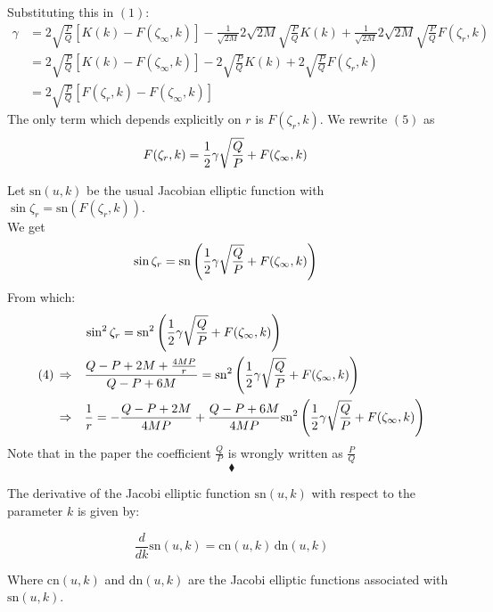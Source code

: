 Substituting this in $(1)$:
\begin{align}
\gamma&=2\sqrt{\frac{P}{Q}}\left[K{\left(k\right)}-F{\left(\zeta_{\infty},k\right)}\right]-\frac{1}{\sqrt{2M}}2\sqrt{2M}\sqrt{\frac{P}{Q}}K{\left(k\right)}+\frac{1}{\sqrt{2M}}2\sqrt{2M}\sqrt{\frac{P}{Q}}F{\left(\zeta_{r},k\right)}\nonumber \\
&=2\sqrt{\frac{P}{Q}}\left[K{\left(k\right)}-F{\left(\zeta_{\infty},k\right)}\right]-2\sqrt{\frac{P}{Q}}K{\left(k\right)}+2\sqrt{\frac{P}{Q}}F{\left(\zeta_{r},k\right)}\nonumber \\
&= 2\sqrt{\frac{P}{Q}}\left[F{\left(\zeta_{r},k\right)} -F{\left(\zeta_{\infty},k\right)}\right]
\end{align}
The only term which depends explicitly on $r$ is $F{\left(\zeta_{r},k\right)}$. We rewrite $(5)$ as 
\begin{align}
F{\left(\zeta_{r},k\right)} &= \frac{1}{2} \gamma\sqrt{\frac{Q}{P}}+F{\left(\zeta_{\infty},k\right)}
\end{align}

Let $\mathrm{sn}(u,k)$ be the usual Jacobian elliptic function with $ \sin{\zeta_{r}}= \mathrm{sn}(F{\left(\zeta_{r},k\right)})$.\\
We get
\begin{align*}
\sin{\zeta_{r}} &=\mathrm{sn}\left( \frac{1}{2} \gamma\sqrt{\frac{Q}{P}}+F{\left(\zeta_{\infty},k\right)}\right)
\end{align*}
From which:
\begin{align}
&\sin^2{\zeta_{r}} =\mathrm{sn}^2\left( \frac{1}{2} \gamma\sqrt{\frac{Q}{P}}+F{\left(\zeta_{\infty},k\right)}\right)\nonumber \\
(4)\,\Rightarrow\quad &\frac{Q-P+2M+\frac{4MP}{r}}{Q-P+6M} =\mathrm{sn}^2\left( \frac{1}{2} \gamma\sqrt{\frac{Q}{P}}+F{\left(\zeta_{\infty},k\right)}\right)\nonumber \\
\Rightarrow\quad &\frac{1}{r} =-\frac{Q-P+2M}{4MP}+\frac{Q-P+6M}{4MP}\mathrm{sn}^2\left( \frac{1}{2} \gamma\sqrt{\frac{Q}{P}}+F{\left(\zeta_{\infty},k\right)}\right)
\end{align}
Note that in the paper the coefficient $\frac{Q}{P}$ is wrongly written  as $\frac{P}{Q}$
$$\blacklozenge$$\newpage

The derivative of the Jacobi elliptic function $\text{sn}(u, k)$ with respect to the parameter $k$ is given by:

$$
\frac{d}{dk} \text{sn}(u, k) = \text{cn}(u, k) \, \text{dn}(u, k)
$$

Where $\text{cn}(u, k)$ and $\text{dn}(u, k)$ are the Jacobi elliptic functions associated with $\text{sn}(u, k)$.

